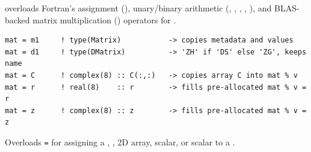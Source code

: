  overloads Fortran's assignment (\procname{=}), unary/binary arithmetic (\procname{+}, \procname{-}, \procname{*}, \procname{/}, \procname{**}), and BLAS-backed matrix multiplication (\procname{*}) operators for .



\lstset{language=[95]Fortran}
\begin{lstlisting}
mat = m1     ! type(Matrix)           -> copies metadata and values
mat = d1     ! type(DMatrix)          -> 'ZH' if 'DS' else 'ZG', keeps name
mat = C      ! complex(8) :: C(:,:)   -> copies array C into mat % v
mat = r      ! real(8)    :: r        -> fills pre-allocated mat % v = r
mat = z      ! complex(8) :: z        -> fills pre-allocated mat % v = z
\end{lstlisting}

Overloads \texttt{=} for assigning a , , 2D  array,  scalar, or  scalar to a .

